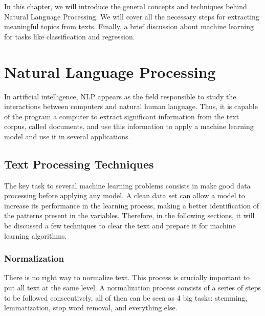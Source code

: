 In this chapter, we will introduce the general concepts and techniques behind Natural Language Processing. We will cover all the necessary steps for extracting meaningful topics from texts. Finally, a brief discussion about machine learning for tasks like classification and regression.


\section{Natural Language Processing}

	In artificial intelligence, NLP appears as the field responsible to study the interactions between computers and natural human language. Thus, it is capable of the program a computer to extract significant information from the text corpus, called documents, and use this information to apply a machine learning model and use it in several applications.

	\subsection{Text Processing Techniques}\label{sec:text-processing}

	The key task to several machine learning problems consists in make good data processing before applying any model. A clean data set can allow a model to increase its performance in the learning process, making a better identification of the patterns present in the variables. Therefore, in the following sections, it will be discussed a few techniques to clear the text and prepare it for machine learning algorithms.

	\subsubsection{Normalization}

	There is no right way to normalize text. This process is crucially important to put all text at the same level. A normalization process consists of a series of steps to be followed consecutively, all of then can be seen as 4 big tasks: stemming, lemmatization, stop word removal, and everything else.

